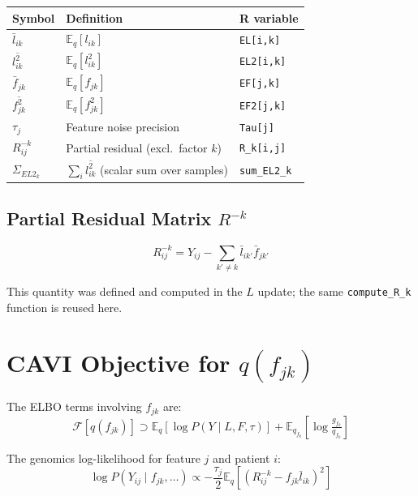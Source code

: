 \documentclass[11pt]{article}
\newcommand{\lbar}[2]{\bar{l}_{#1#2}}
\newcommand{\fbar}[2]{\bar{f}_{#1#2}}
\newcommand{\lsec}[2]{\overline{l^2_{#1#2}}}
\newcommand{\fsec}[2]{\overline{f^2_{#1#2}}}
\newcommand{\Rk}[0]{R^{-k}}
\begin{document}
\begin{center}
\begin{tabular}{lll}
\toprule
\textbf{Symbol} & \textbf{Definition} & \textbf{R variable} \\
\midrule
$\lbar{i}{k}$ & $\mathbb{E}_q[l_{ik}]$ & \texttt{EL[i,k]} \\
$\lsec{i}{k}$ & $\mathbb{E}_q[l_{ik}^2]$ & \texttt{EL2[i,k]} \\
$\fbar{j}{k}$ & $\mathbb{E}_q[f_{jk}]$ & \texttt{EF[j,k]} \\
$\fsec{j}{k}$ & $\mathbb{E}_q[f_{jk}^2]$ & \texttt{EF2[j,k]} \\
$\tau_j$ & Feature noise precision & \texttt{Tau[j]} \\
$\Rk_{ij}$ & Partial residual (excl.\ factor $k$) & \texttt{R\_k[i,j]} \\
$\Sigma_{EL2_k}$ & $\sum_i\lsec{i}{k}$ (scalar sum over samples) & \texttt{sum\_EL2\_k} \\
\bottomrule
\end{tabular}
\end{center}

\subsection{Partial Residual Matrix $\Rk$}

\begin{equation}
  \Rk_{ij} = Y_{ij} - \sum_{k'\neq k}\lbar{i}{k'}\fbar{j}{k'}
  \label{eq:Rk}
\end{equation}

This quantity was defined and computed in the $L$ update; the same
\texttt{compute\_R\_k} function is reused here.

\section{CAVI Objective for $q(f_{jk})$}\label{sec:objective}

The ELBO terms involving $f_{jk}$ are:
\begin{equation}
  \mathcal{F}[q(f_{jk})] \supset
  \mathbb{E}_q\!\left[\log P(Y \mid L, F, \tau)\right]
  + \mathbb{E}_{q_{f_k}}\!\left[\log\tfrac{g_{f_k}}{q_{f_k}}\right]
  \label{eq:elbo}
\end{equation}

The genomics log-likelihood for feature $j$ and patient $i$:
\begin{equation}
  \log P(Y_{ij} \mid f_{jk}, \ldots)
  \propto -\frac{\tau_j}{2}\mathbb{E}_q\!\left[(\Rk_{ij} - f_{jk}\lbar{i}{k})^2\right]
  \label{eq:llik-ij}
\end{equation}
\end{document}
